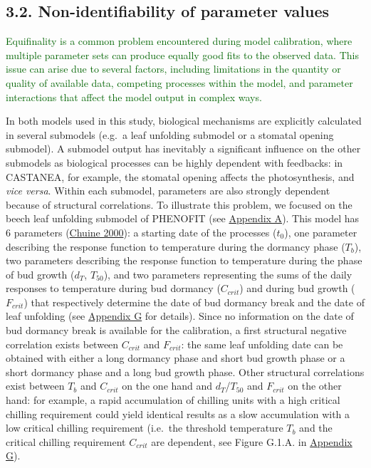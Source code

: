 \documentclass[11pt,]{article}
\begin{document}
\hypertarget{non-identifiability-of-parameter-values}{%
\subsection{3.2. Non-identifiability of parameter
values}\label{non-identifiability-of-parameter-values}}

\textcolor{darkgreen}{Equifinality is a common problem encountered during model calibration, where multiple parameter sets can produce equally good fits to the observed data. This issue can arise due to several factors, including limitations in the quantity or quality of available data, competing processes within the model, and parameter interactions that affect the model output in complex ways.}

In both models used in this study, biological mechanisms are explicitly
calculated in several submodels (e.g.~a leaf unfolding submodel or a
stomatal opening submodel). A submodel output has inevitably a
significant influence on the other submodels as biological processes can
be highly dependent with feedbacks: in CASTANEA, for example, the
stomatal opening affects the photosynthesis, and \emph{vice versa}.
Within each submodel, parameters are also strongly dependent because of
structural correlations. To illustrate this problem, we focused on the
beech leaf unfolding submodel of PHENOFIT (see
\protect\hyperlink{appendixA}{Appendix A}). This model has 6 parameters
(\protect\hyperlink{ref-Chuine2000}{Chuine 2000}): a starting date of
the processes (\(t_0\)), one parameter describing the response function
to temperature during the dormancy phase (\(T_b\)), two parameters
describing the response function to temperature during the phase of bud
growth (\(d_T\), \(T_{50}\)), and two parameters representing the sums
of the daily responses to temperature during bud dormancy (\(C_{crit}\))
and during bud growth (\(F_{crit}\)) that respectively determine the
date of bud dormancy break and the date of leaf unfolding (see
\protect\hyperlink{appendixG}{Appendix G} for details). Since no
information on the date of bud dormancy break is available for the
calibration, a first structural negative correlation exists between
\(C_{crit}\) and \(F_{crit}\): the same leaf unfolding date can be
obtained with either a long dormancy phase and short bud growth phase or
a short dormancy phase and a long bud growth phase. Other structural
correlations exist between \(T_b\) and \(C_{crit}\) on the one hand and
\(d_T\)/\(T_{50}\) and \(F_{crit}\) on the other hand: for example, a
rapid accumulation of chilling units with a high critical chilling
requirement could yield identical results as a slow accumulation with a
low critical chilling requirement (i.e.~the threshold temperature
\(T_{b}\) and the critical chilling requirement \(C_{crit}\) are
dependent, see Figure G.1.A. in \protect\hyperlink{appendixG}{Appendix
G}).
\end{document}
